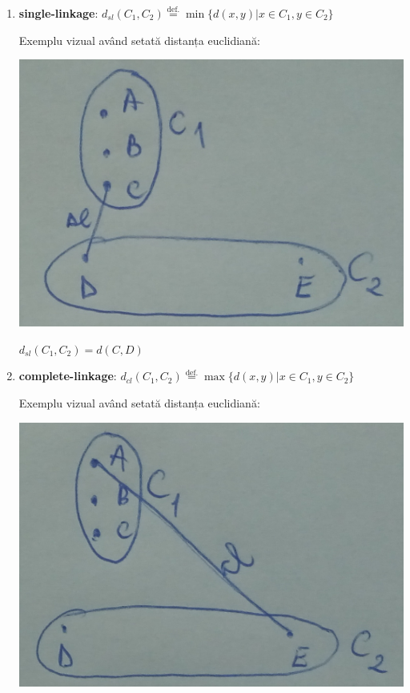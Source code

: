 \documentclass[12pt]{article}
\begin{document}
	\begin{enumerate}
		\item \textbf{single-linkage}: $d_{sl}(C_1,C_2) \stackrel{\text{def.}}{=} \min\{d(x,y) | x\in C_1, y\in C_2\}$
		
		Exemplu vizual având setată distanța euclidiană: 
		\begin{center}
			\includegraphics{screenshot004}
		\end{center}
		
		
		$d_{sl}(C_1,C_2) = d(C,D)$
		
		\item \textbf{complete-linkage}: $d_{cl}(C_1,C_2) \stackrel{\text{def.}}{=} \max\{d(x,y) | x\in C_1, y\in C_2\}$
		
		Exemplu vizual având setată distanța euclidiană: \begin{center}
			\includegraphics{screenshot005}
		\end{center}
		

\end{enumerate}
\end{document}
